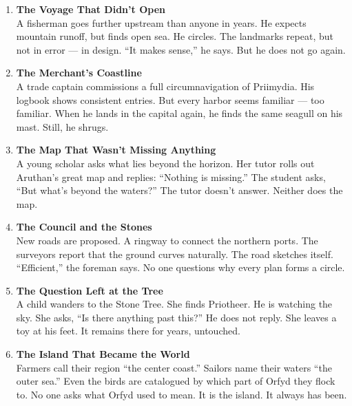 \documentclass[9pt]{article}
\begin{document}
\begin{enumerate}
    \item \textbf{The Voyage That Didn't Open} \\
    A fisherman goes further upstream than anyone in years. He expects mountain runoff, but finds open sea. He circles. The landmarks repeat, but not in error — in design. ``It makes sense,'' he says. But he does not go again.

    \vspace{1em}
    \item \textbf{The Merchant’s Coastline} \\
    A trade captain commissions a full circumnavigation of Priimydia. His logbook shows consistent entries. But every harbor seems familiar — too familiar. When he lands in the capital again, he finds the same seagull on his mast. Still, he shrugs.

    \vspace{1em}
    \item \textbf{The Map That Wasn’t Missing Anything} \\
    A young scholar asks what lies beyond the horizon. Her tutor rolls out Aruthan’s great map and replies: ``Nothing is missing.'' The student asks, ``But what’s beyond the waters?'' The tutor doesn’t answer. Neither does the map.

    \vspace{1em}
    \item \textbf{The Council and the Stones} \\
    New roads are proposed. A ringway to connect the northern ports. The surveyors report that the ground curves naturally. The road sketches itself. ``Efficient,'' the foreman says. No one questions why every plan forms a circle.

    \vspace{1em}
    \item \textbf{The Question Left at the Tree} \\
    A child wanders to the Stone Tree. She finds Priotheer. He is watching the sky. She asks, ``Is there anything past this?'' He does not reply. She leaves a toy at his feet. It remains there for years, untouched.

    \vspace{1em}
    \item \textbf{The Island That Became the World} \\
    Farmers call their region ``the center coast.'' Sailors name their waters ``the outer sea.'' Even the birds are catalogued by which part of Orfyd they flock to. No one asks what Orfyd used to mean. It is the island. It always has been.
\end{enumerate}
\end{document}
